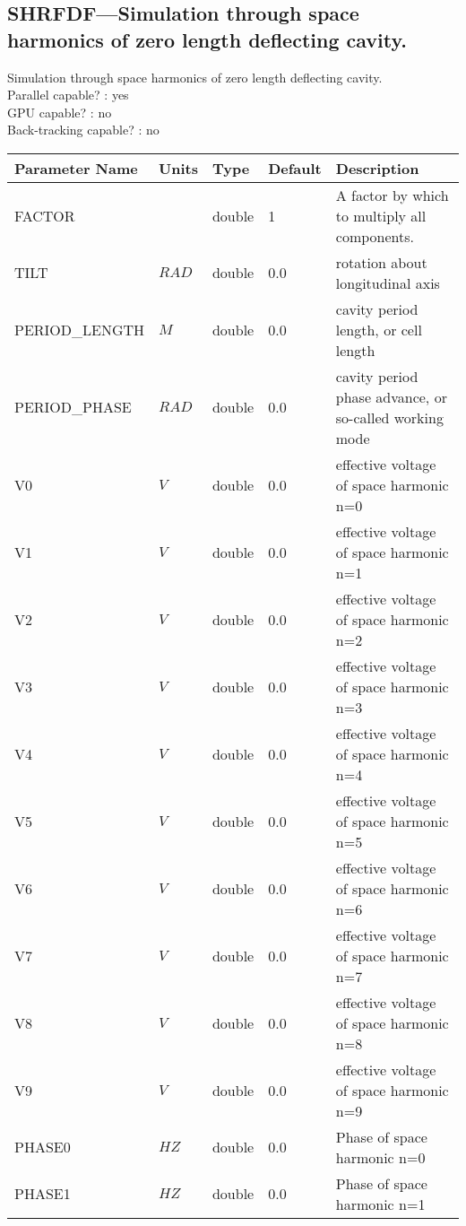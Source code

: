 \subsection{SHRFDF---Simulation through space harmonics of zero length deflecting cavity.}
Simulation through space harmonics of zero length deflecting cavity.
\\
Parallel capable? : yes\\
GPU capable? : no\\
Back-tracking capable? : no\\
\begin{tabular}{|l|l|l|l|p{\descwidth}|} \hline
Parameter Name & Units & Type & Default & Description \\ \hline 
FACTOR &  & double &   1 & A factor by which to multiply all components.  \\ \hline 
TILT & $RAD$ & double &  0.0 & rotation about longitudinal axis  \\ \hline 
PERIOD\_LENGTH & $M$ & double &  0.0 & cavity period length, or cell length  \\ \hline 
PERIOD\_PHASE & $RAD$ & double &  0.0 & cavity period phase advance, or so-called working mode  \\ \hline 
V0 & $V$ & double &  0.0 & effective voltage of space harmonic n=0  \\ \hline 
V1 & $V$ & double &  0.0 & effective voltage of space harmonic n=1  \\ \hline 
V2 & $V$ & double &  0.0 & effective voltage of space harmonic n=2  \\ \hline 
V3 & $V$ & double &  0.0 & effective voltage of space harmonic n=3  \\ \hline 
V4 & $V$ & double &  0.0 & effective voltage of space harmonic n=4  \\ \hline 
V5 & $V$ & double &  0.0 & effective voltage of space harmonic n=5  \\ \hline 
V6 & $V$ & double &  0.0 & effective voltage of space harmonic n=6  \\ \hline 
V7 & $V$ & double &  0.0 & effective voltage of space harmonic n=7  \\ \hline 
V8 & $V$ & double &  0.0 & effective voltage of space harmonic n=8  \\ \hline 
V9 & $V$ & double &  0.0 & effective voltage of space harmonic n=9  \\ \hline 
PHASE0 & $HZ$ & double &  0.0 & Phase of space harmonic n=0  \\ \hline 
PHASE1 & $HZ$ & double &  0.0 & Phase of space harmonic n=1  \\ \hline 

\end{tabular}
